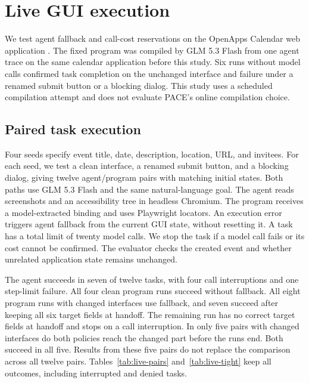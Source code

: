 \section{Live GUI execution}
\label{app:live}

We test agent fallback and call-cost reservations on the OpenApps Calendar web application \citep{ullrich2025openapps}.
The fixed program was compiled by GLM 5.3 Flash from one agent trace on the same calendar application before this study.
Six runs without model calls confirmed task completion on the unchanged interface and failure under a renamed submit button or a blocking dialog.
This study uses a scheduled compilation attempt and does not evaluate PACE's online compilation choice.

\subsection{Paired task execution}
Four seeds specify event title, date, description, location, URL, and invitees.
For each seed, we test a clean interface, a renamed submit button, and a blocking dialog, giving twelve agent/program pairs with matching initial states.
Both paths use GLM 5.3 Flash and the same natural-language goal.
The agent reads screenshots and an accessibility tree in headless Chromium.
The program receives a model-extracted binding and uses Playwright locators.
An execution error triggers agent fallback from the current GUI state, without resetting it.
A task has a total limit of twenty model calls.
We stop the task if a model call fails or its cost cannot be confirmed.
The evaluator checks the created event and whether unrelated application state remains unchanged.



The agent succeeds in seven of twelve tasks, with four call interruptions and one step-limit failure.
All four clean program runs succeed without fallback.
All eight program runs with changed interfaces use fallback, and seven succeed after keeping all six target fields at handoff.
The remaining run has no correct target fields at handoff and stops on a call interruption.
In only five pairs with changed interfaces do both policies reach the changed part before the runs end.
Both succeed in all five.
Results from these five pairs do not replace the comparison across all twelve pairs.
Tables~\ref{tab:live-pairs} and~\ref{tab:live-tight} keep all outcomes, including interrupted and denied tasks.



